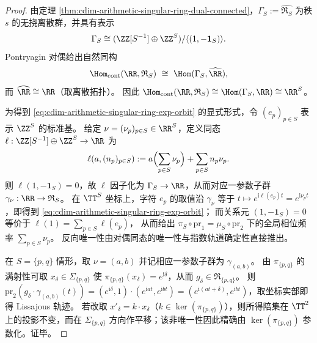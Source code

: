 \begin{proof}
由定理 \ref{thm:cdim-arithmetic-singular-ring-dual-connected}，\(\Gamma_S:=\widehat{\mathfrak{R}_S}\) 为秩 \(s\) 的无挠离散群，并具有表示
\[
\Gamma_S\cong (\ZZ[S^{-1}]\oplus \ZZ^{S})/\langle(1,-\mathbf{1}_S)\rangle.
\]
Pontryagin 对偶给出自然同构
\[
\Hom_{\mathrm{cont}}(\RR,\mathfrak{R}_S)\ \cong\ \Hom(\Gamma_S,\widehat{\RR}),
\]
而 \(\widehat{\RR}\cong\RR\)（取离散拓扑）。
因此 \(\Hom_{\mathrm{cont}}(\RR,\mathfrak{R}_S)\cong \Hom(\Gamma_S,\RR)\cong \RR^S\)。
\par
为得到 \eqref{eq:cdim-arithmetic-singular-ring-exp-orbit} 的显式形式，令 \((e_p)_{p\in S}\) 表示 \(\ZZ^{S}\) 的标准基。
给定 \(\nu=(\nu_p)_{p\in S}\in\RR^{S}\)，定义同态 \(\ell:\ZZ[S^{-1}]\oplus\ZZ^{S}\to\RR\) 为
\[
\ell(a,(n_p)_{p\in S})
:=a\Bigl(\sum_{p\in S}\nu_p\Bigr)+\sum_{p\in S}n_p\nu_p.
\]
则 \(\ell(1,-\mathbf 1_S)=0\)，故 \(\ell\) 因子化为 \(\Gamma_S\to\RR\)，从而对应一参数子群 \(\gamma_{\nu}:\RR\to\mathfrak{R}_S\)。
在 \(\TT^S\) 坐标上，字符 \(e_p\) 的取值沿 \(\gamma_\nu\) 等于 \(t\mapsto e^{\mathrm{i}\ell(e_p)t}=e^{\mathrm{i}\nu_pt}\)，即得到 \eqref{eq:cdim-arithmetic-singular-ring-exp-orbit}；
而关系元 \((1,-\mathbf{1}_S)=0\) 等价于
\(
\ell(1)=\sum_{p\in S}\ell(e_p)
\)，
从而给出 \(\pi_S\circ \mathrm{pr}_1=\mu_S\circ \mathrm{pr}_2\) 下的全局相位频率 \(\sum_{p\in S}\nu_p\)。
反向唯一性由对偶同态的唯一性与指数轨道确定性直接推出。
\par
在 \(S=\{p,q\}\) 情形，取 \(\nu=(a,b)\) 并记相应一参数子群为 \(\gamma_{(a,b)}\)。
由 \(\pi_{\{p,q\}}\) 的满射性可取 \(x_{\delta}\in\Sigma_{\{p,q\}}\) 使 \(\pi_{\{p,q\}}(x_\delta)=e^{\mathrm{i}\delta}\)，从而 \(g_{\delta}\in\mathfrak{R}_{\{p,q\}}\)。
则 \(\mathrm{pr}_2(g_{\delta}\cdot\gamma_{(a,b)}(t))=(e^{\mathrm{i}\delta},1)\cdot(e^{\mathrm{i}at},e^{\mathrm{i}bt})=(e^{\mathrm{i}(at+\delta)},e^{\mathrm{i}bt})\)，取坐标实部即得 Lissajous 轨迹。
若改取 \(x'_{\delta}=k\cdot x_{\delta}\)（\(k\in\ker(\pi_{\{p,q\}})\)），则所得陪集在 \(\TT^2\) 上的投影不变，而在 \(\Sigma_{\{p,q\}}\) 方向作平移；该非唯一性因此精确由 \(\ker(\pi_{\{p,q\}})\) 参数化。证毕。
\end{proof}

